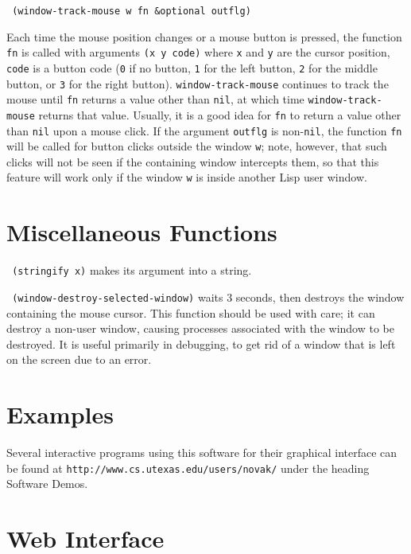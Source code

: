 {\tt \hspace*{0.5in} (window-track-mouse w fn \&optional outflg)}
          
\vspace{-0.05in}
Each time the mouse position changes or a mouse button is pressed,
the function {\tt fn} is called with
arguments {\tt (x y code)} where {\tt x} and {\tt y} are the cursor
position, {\tt code} is a button code ({\tt 0} if no button, {\tt 1} for
the left button, {\tt 2} for the middle button, or {\tt 3} for the right
button).  {\tt window-track-mouse} continues to track the mouse until {\tt fn}
returns a value other than {\tt nil}, at which time {\tt window-track-mouse}
returns that value.  Usually, it is a good idea for {\tt fn} to return a
value other than {\tt nil} upon a mouse click.  If the argument {\tt outflg}
is non-{\tt nil}, the function {\tt fn} will be called for button clicks
outside the window {\tt w}; note, however, that such clicks will not be
seen if the containing window intercepts them, so that this feature will
work only if the window {\tt w} is inside another Lisp user window.


\section{Miscellaneous Functions}

{\tt \hspace*{0.5in} (stringify x)} makes its argument into a string.

{\tt \hspace*{0.5in} (window-destroy-selected-window)} waits 3 seconds,
then destroys the window containing the mouse cursor.  This function
should be used with care; it can destroy a non-user window, causing
processes associated with the window to be destroyed.  It is useful
primarily in debugging, to get rid of a window that is left on the screen
due to an error.
                

\section{Examples}

Several interactive programs using this software for their graphical
interface can be found at {\tt http://www.cs.utexas.edu/users/novak/}
under the heading Software Demos.


\section{Web Interface}

